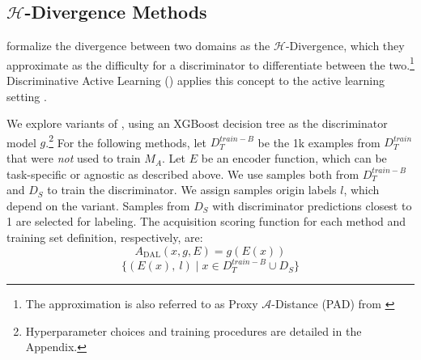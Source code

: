     \respace
    \respace
    \subsection{$\mathcal{H}$-Divergence Methods}
    \label{sec:h-divergence-methods}
    \citet{ben2006analysis, ben2010theory} formalize the divergence between two domains as the $\mathcal{H}$-Divergence, which they approximate as the difficulty for a discriminator to differentiate between the two.\footnote{The approximation is also referred to as Proxy $\mathcal{A}$-Distance (PAD) from \citep{elsahar-galle-2019-annotate}}
    Discriminative Active Learning (\dal) applies this concept to the active learning setting \citep{gissin2019discriminative}.
    
    We explore variants of \dal{}, using an XGBoost decision tree \citep{Chen:2016:XST:2939672.2939785} as the discriminator model $g$.\footnote{Hyperparameter choices and training procedures are detailed in the Appendix.}
    For the following methods, let $D_T^{train-B}$ be the 1k examples from $D_T^{train}$ that were \emph{not} used to train $M_A$. 
    Let $E$ be an encoder function, which can be task-specific or agnostic as described above. 
    We use samples both from $D_T^{train-B}$ and $D_S$ to train the discriminator. 
    We assign samples origin labels $l$, which depend on the \dal{} variant. 
    Samples from $D_S$ with discriminator predictions closest to 1 are selected for labeling.
    The acquisition scoring function for each \dal{} method and training set definition, respectively, are:
    \respace
    \respace
    $$A_{\text{DAL}}(x, g, E) = g(E(x)) $$
    $$ \{(E(x), \: l) \; | \; x \in D_T^{train-B} \cup D_{S} \}$$


        \respace
        \respace
